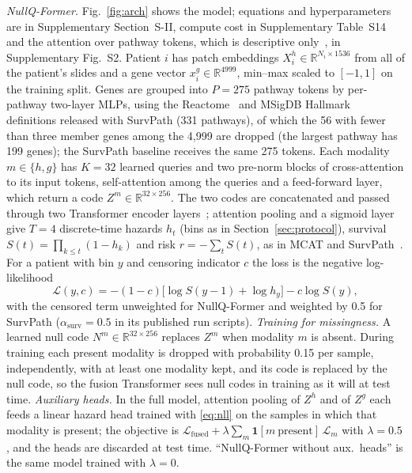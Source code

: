 \documentclass[journal]{IEEEtran}
\newcommand{\pq}{NullQ-Former}
\begin{document}
\textit{\pq{}.} Fig.~\ref{fig:arch} shows the model; equations and hyperparameters are in Supplementary Section~S-II, compute cost in Supplementary Table~S14 and the attention over pathway tokens, which is descriptive only~\cite{jain2019attention}, in Supplementary Fig.~S2. Patient $i$ has patch embeddings $X^h_i \in \mathbb{R}^{N_i \times 1536}$ from all of the patient's slides and a gene vector $x^g_i \in \mathbb{R}^{4999}$, min--max scaled to $[-1, 1]$ on the training split. Genes are grouped into $P = 275$ pathway tokens by per-pathway two-layer MLPs, using the Reactome~\cite{gillespie2022reactome} and MSigDB Hallmark~\cite{liberzon2015hallmark} definitions released with SurvPath (331 pathways), of which the 56 with fewer than three member genes among the 4,999 are dropped (the largest pathway has 199 genes); the SurvPath baseline receives the same 275 tokens. Each modality $m \in \{h, g\}$ has $K = 32$ learned queries and two pre-norm blocks of cross-attention to its input tokens, self-attention among the queries and a feed-forward layer, which return a code $Z^m \in \mathbb{R}^{32 \times 256}$. The two codes are concatenated and passed through two Transformer encoder layers~\cite{vaswani2017attention}; attention pooling and a sigmoid layer give $T = 4$ discrete-time hazards $h_t$ (bins as in Section~\ref{sec:protocol}), survival $S(t) = \prod_{k \le t}(1 - h_k)$ and risk $r = -\sum_t S(t)$, as in MCAT and SurvPath~\cite{zadeh2021bias}. For a patient with bin $y$ and censoring indicator $c$ the loss is the negative log-likelihood
\begin{equation}
\mathcal{L}(y, c) = -(1 - c)\big[\log S(y - 1) + \log h_y\big] - c \log S(y),
\label{eq:nll}
\end{equation}
with the censored term unweighted for \pq{} and weighted by 0.5 for SurvPath ($\alpha_{\text{surv}} = 0.5$ in its published run scripts). \emph{Training for missingness.} A learned null code $N^m \in \mathbb{R}^{32 \times 256}$ replaces $Z^m$ when modality $m$ is absent. During training each present modality is dropped with probability 0.15 per sample, independently, with at least one modality kept, and its code is replaced by the null code, so the fusion Transformer sees null codes in training as it will at test time. \emph{Auxiliary heads.} In the full model, attention pooling of $Z^h$ and of $Z^g$ each feeds a linear hazard head trained with \eqref{eq:nll} on the samples in which that modality is present; the objective is $\mathcal{L}_{\text{fused}} + \lambda \sum_m \mathbf{1}[m\ \text{present}]\, \mathcal{L}_m$ with $\lambda = 0.5$, and the heads are discarded at test time. ``\pq{} without aux.\ heads'' is the same model trained with $\lambda = 0$.
\end{document}
